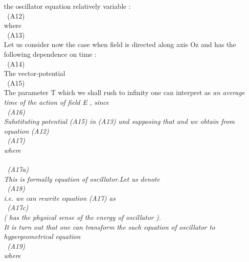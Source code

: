 \documentclass[a4paper,12pt] {article}
\begin{document}
the  oscillator equation \rm relatively   variable \myHighlight{$\xi$}\coordHE{}:\\ \coordHE{} \ (A12)\\ where
\\ \coordHE{} \ (A13)\\ Let us consider now the case when  field
\coordHE{} is directed along axis Oz and has the following dependence on time :
\\\coordHE{} \ (A14)\\ The vector-potential
\\ \coordHE{} \ (A15) \\ The parameter T which we
shall rush to infinity one can interpret as \it  an average time of the action of  field \rm  E , since
 \\\coordHE{} \ (A16)\\ Substituting potential
 (A15) in  (A13) und supposing that \coordHE{} and \coordHE{} we obtain from equation (A12)\\
 \coordHE{} \ (A17) \\ where
\\ \coordHE{}\\\coordHE{} \ (A17a) \\ This is formally
 equation of oscillator.Let us denote \\\coordHE{} \ (A18)\\i.e. we can rewrite
 equation (A17) as\\ \coordHE{} \ (A17c)\\
 (\myHighlight{$\varepsilon$}\coordHE{} has the physical sense \it  of  the energy of oscillator \rm).
\\  It is turn out \it  that one can transform  the such equation of oscillator to  hypergeometrical  equation \rm
\\\coordHE{} \ (A19) \\where
\end{document}
